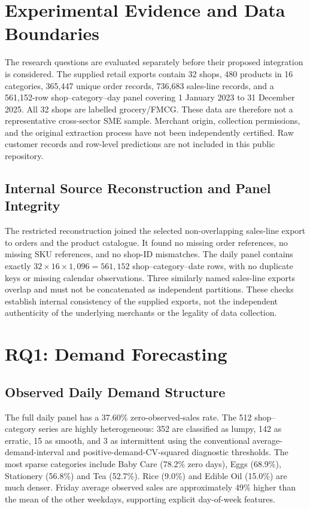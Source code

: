 \section{Experimental Evidence and Data Boundaries}

The research questions are evaluated separately before their proposed integration is considered. The supplied retail exports contain 32 shops, 480 products in 16 categories, 365,447 unique order records, 736,683 sales-line records, and a 561,152-row shop--category--day panel covering 1 January 2023 to 31 December 2025. All 32 shops are labelled grocery/FMCG. These data are therefore not a representative cross-sector SME sample. Merchant origin, collection permissions, and the original extraction process have not been independently certified. Raw customer records and row-level predictions are not included in this public repository.

\subsection{Internal Source Reconstruction and Panel Integrity}

The restricted reconstruction joined the selected non-overlapping sales-line export to orders and the product catalogue. It found no missing order references, no missing SKU references, and no shop-ID mismatches. The daily panel contains exactly \(32\times16\times1{,}096=561{,}152\) shop--category--date rows, with no duplicate keys or missing calendar observations. Three similarly named sales-line exports overlap and must not be concatenated as independent partitions. These checks establish internal consistency of the supplied exports, not the independent authenticity of the underlying merchants or the legality of data collection.

\section{RQ1: Demand Forecasting}

\subsection{Observed Daily Demand Structure}

The full daily panel has a 37.60\% zero-observed-sales rate. The 512 shop--category series are highly heterogeneous: 352 are classified as lumpy, 142 as erratic, 15 as smooth, and 3 as intermittent using the conventional average-demand-interval and positive-demand-CV-squared diagnostic thresholds. The most sparse categories include Baby Care (78.2\% zero days), Eggs (68.9\%), Stationery (56.8\%) and Tea (52.7\%). Rice (9.0\%) and Edible Oil (15.0\%) are much denser. Friday average observed sales are approximately 49\% higher than the mean of the other weekdays, supporting explicit day-of-week features.

